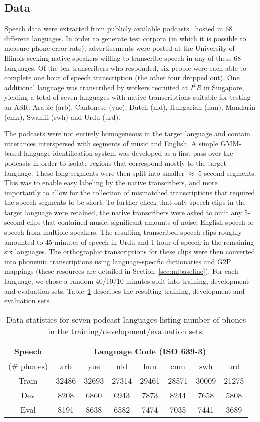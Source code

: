 \subsection{Data}
\label{sec:data}

Speech data were extracted from publicly available podcasts~\cite{SBS}
hosted in 68 different languages.  In order to generate test corpora
(in which it is possible to measure phone error rate), advertisements
were posted at the University of Illinois seeking native speakers
willing to transcribe speech in any of these 68 languages.  Of the ten
transcribers who responded, six people were each able to complete one
hour of speech transcription (the other four dropped out).  One
additional language was transcribed by workers recruited at $I^2R$ in
Singapore, yielding a total of seven languages with native
transcriptions suitable for testing an ASR: Arabic (arb), Cantonese
(yue), Dutch (nld), Hungarian (hun), Mandarin (cmn), Swahili (swh) and
Urdu (urd).

The podcasts were not entirely homogeneous in the target
language and contain utterances interspersed with segments of music
and English. A simple GMM-based language identification system was
developed as a first pass over the podcasts in order to isolate
regions that correspond mostly to the target language. These long
segments were then split into smaller $\approx$ 5-second
segments. This was to enable easy labeling by the native transcribers,
and more importantly to allow for the collection of mismatched
transcriptions that required the speech segments to be short. To
further check that only speech clips in the target language were
retained, the native transcribers were asked to omit any 5-second
clips that contained music, significant amounts of noise, English
speech or speech from multiple speakers. The resulting transcribed
speech clips roughly amounted to 45 minutes of speech in Urdu and 1
hour of speech in the remaining six languages. The orthographic
transcriptions for these clips were then converted into phonemic
transcriptions using language-specific dictionaries and G2P mappings
(these resources are detailed in Section~\ref{sec:mlbaseline}). For
each language, we chose a random 40/10/10 minutes split into training,
development and evaluation sets.  Table~\ref{tab:data} describes the
resulting training, development and evaluation sets.
\begin{table}[t]
\centering
\begin{tabular}{|c||c|c|c|c|c|c|c|}\hline
Speech  & \multicolumn{7}{c|}{Language Code (ISO 639-3)}\\\hline
(\# phones) & arb & yue & nld & hun & cmn & swh & urd \\ \hline\hline
Train & 32486 & 32693 & 27314 & 29461 & 28571 & 30009 & 21275 \\
Dev & 8208 & 6860 & 6943 & 7873 & 8244 & 7658 & 5808 \\
Eval & 8191 & 8638 & 6582 & 7474 & 7035 & 7441 & 3689 \\\hline
\end{tabular}
\caption{Data statistics for seven podcast languages listing number of
phones in the training/development/evaluation sets.}
\label{tab:data}
\end{table}
